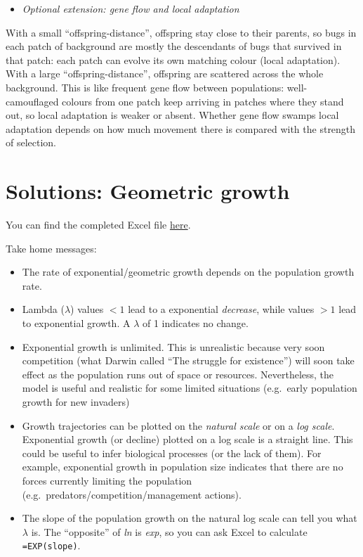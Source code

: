 \documentclass[
  a4paper]{book}
\providecommand{\tightlist}{%
  \setlength{\itemsep}{0pt}\setlength{\parskip}{0pt}}
\begin{document}
\begin{itemize}
\tightlist
\item
  \emph{Optional extension: gene flow and local adaptation}
\end{itemize}

With a small ``offspring-distance'', offspring stay close to their parents, so bugs in each patch of background are mostly the descendants of bugs that survived in that patch: each patch can evolve its own matching colour (local adaptation). With a large ``offspring-distance'', offspring are scattered across the whole background. This is like frequent gene flow between populations: well-camouflaged colours from one patch keep arriving in patches where they stand out, so local adaptation is weaker or absent. Whether gene flow swamps local adaptation depends on how much movement there is compared with the strength of selection.

\section{Solutions: Geometric growth}\label{solutions-geometric-growth}

You can find the completed Excel file \href{https://www.dropbox.com/s/sfxu1lbrxyqt462/GeometricGrowth\%20-\%20complete.xlsx?dl=1}{here}.

Take home messages:

\begin{itemize}
\tightlist
\item
  The rate of exponential/geometric growth depends on the population growth rate.
\item
  Lambda (\(\lambda\)) values \(<1\) lead to a exponential \emph{decrease}, while values \(>1\) lead to exponential growth. A \(\lambda\) of 1 indicates no change.
\item
  Exponential growth is unlimited. This is unrealistic because very soon competition (what Darwin called ``The struggle for existence'') will soon take effect as the population runs out of space or resources. Nevertheless, the model is useful and realistic for some limited situations (e.g.~early population growth for new invaders)
\item
  Growth trajectories can be plotted on the \emph{natural scale} or on a \emph{log scale}. Exponential growth (or decline) plotted on a log scale is a straight line. This could be useful to infer biological processes (or the lack of them). For example, exponential growth in population size indicates that there are no forces currently limiting the population (e.g.~predators/competition/management actions).
\item
  The slope of the population growth on the natural log scale can tell you what \(\lambda\) is. The ``opposite'' of \emph{ln} is \emph{exp}, so you can ask Excel to calculate \texttt{=EXP(slope)}.
\end{itemize}
\end{document}
